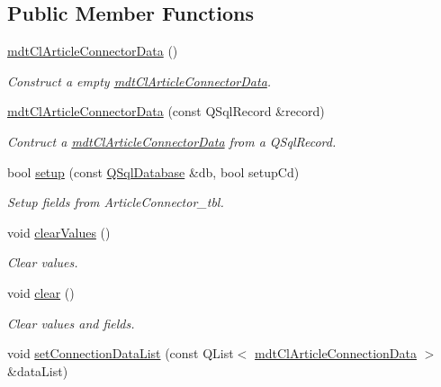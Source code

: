 \subsection*{Public Member Functions}
\begin{DoxyCompactItemize}
\item 
\hyperlink{classmdt_cl_article_connector_data_abf1822300bf3ea388abee0a0d6732e6a}{mdt\-Cl\-Article\-Connector\-Data} ()
\begin{DoxyCompactList}\small\item\em Construct a empty \hyperlink{classmdt_cl_article_connector_data}{mdt\-Cl\-Article\-Connector\-Data}. \end{DoxyCompactList}\item 
\hyperlink{classmdt_cl_article_connector_data_a3a967b47ca629567f19ed542c6e2ce05}{mdt\-Cl\-Article\-Connector\-Data} (const Q\-Sql\-Record \&record)
\begin{DoxyCompactList}\small\item\em Contruct a \hyperlink{classmdt_cl_article_connector_data}{mdt\-Cl\-Article\-Connector\-Data} from a Q\-Sql\-Record. \end{DoxyCompactList}\item 
bool \hyperlink{classmdt_cl_article_connector_data_a652df1f49424aee174a20df109f05d90}{setup} (const \hyperlink{class_q_sql_database}{Q\-Sql\-Database} \&db, bool setup\-Cd)
\begin{DoxyCompactList}\small\item\em Setup fields from Article\-Connector\-\_\-tbl. \end{DoxyCompactList}\item 
void \hyperlink{classmdt_cl_article_connector_data_aeaacf0004607ce3c4f0908af538c900d}{clear\-Values} ()
\begin{DoxyCompactList}\small\item\em Clear values. \end{DoxyCompactList}\item 
void \hyperlink{classmdt_cl_article_connector_data_a0ef0711ad63b3e80b54f9ddd3fd6e218}{clear} ()
\begin{DoxyCompactList}\small\item\em Clear values and fields. \end{DoxyCompactList}\item 
void \hyperlink{classmdt_cl_article_connector_data_ac2825245373ab0376c763c14a792c4d9}{set\-Connection\-Data\-List} (const Q\-List$<$ \hyperlink{classmdt_cl_article_connection_data}{mdt\-Cl\-Article\-Connection\-Data} $>$ \&data\-List)

\end{DoxyCompactItemize}
